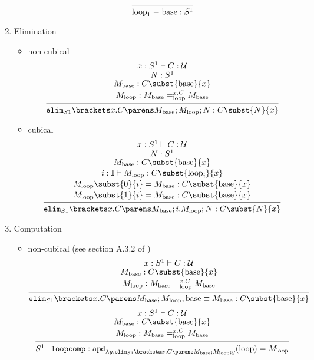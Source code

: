\documentclass[11pt]{article}
\begin{document}
\begin{enumerate}
\begin{itemize}
\[
    \begin{prooftree}
        \infer0{\oftype{\eqtype{\loops_1}{\base}}{S^1}}
    \end{prooftree}
\]
        \end{itemize}
    \item Elimination
        \begin{itemize}
            \item non-cubical
\[
    \begin{prooftree}
        \hypo{\oftype{\oftype{x}{S^1}}{C}{\UU}}
        \infer[no rule]1{\oftype{N}{S^1}}
        \infer[no rule]1{\oftype{M_{\base}}{C\subst{\base}{x}}}
        \infer[no rule]1{\oftype{M_{\loops}}{M_{\base}=_{\loops}^{x.C}M_{\base}}}
        \infer1{\oftype{\circase{S1}{x}{C}{M_{\base}}{M_{\loops}}{N}}{C\subst{N}{x}}}
    \end{prooftree}
\]
            \item cubical
\[
    \begin{prooftree}
        \hypo{\oftype{\oftype{x}{S^1}}{C}{\UU}}
        \infer[no rule]1{\oftype{N}{S^1}}
        \infer[no rule]1{\oftype{M_{\base}}{C\subst{\base}{x}}}
        \infer[no rule]1{\oftype{i:\bI}{M_{\loops}}{C\subst{\loops_i}{x}}}
        \infer[no rule]1{\oftype{M_{\loops}\subst{0}{i}=M_{\base}}{C\subst{\base}{x}}}
        \infer[no rule]1{\oftype{M_{\loops}\subst{1}{i}=M_{\base}}{C\subst{\base}{x}}}
        \infer1{\oftype{\circase{S1}{x}{C}{M_{\base}}{i.M_{\loops}}{N}}{C\subst{N}{x}}}
    \end{prooftree}
\]
        \end{itemize}
    \item Computation
        \begin{itemize}
            \item non-cubical (see section A.3.2 of \cite{hott-as:book})
\[
    \begin{prooftree}
        \hypo{\oftype{\oftype{x}{S^1}}{C}{\UU}}
        \infer[no rule]1{\oftype{M_{\base}}{C\subst{\base}{x}}}
        \infer[no rule]1{\oftype{M_{\loops}}{M_{\base}=_{\loops}^{x.C}M_{\base}}}
        \infer1{\oftype{\eqtype{\circase{S1}{x}{C}{M_{\base}}{M_{\loops}}{\base}}{M_{\base}}}{C\subst{\base}{x}}}
    \end{prooftree}
\]
\[
    \begin{prooftree}
        \hypo{\oftype{\oftype{x}{S^1}}{C}{\UU}}
        \infer[no rule]1{\oftype{M_{\base}}{C\subst{\base}{x}}}
        \infer[no rule]1{\oftype{M_{\loops}}{M_{\base}=_{\loops}^{x.C}M_{\base}}}
        \infer1{\oftype{S^1\mathtt{-loopcomp}}{\mathtt{apd}_{\lam{y}{\circase{S1}{x}{C}{M_{\base}}{M_{\loops}}{y}}}(\loops)=M_{\loops}}}

\end{prooftree}\]
\end{itemize}
\end{enumerate}
\end{document}
